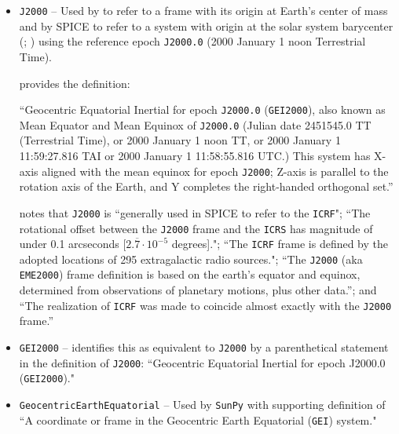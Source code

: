 \documentclass[draft]{agujournal2019}
\begin{document}
\begin{itemize}
    \parskip 0.1in 

    \item \texttt{J2000} -- Used by  to refer to a frame with its origin at Earth's center of mass and by SPICE to refer to a system with origin at the solar system barycenter (; ) using the reference epoch \texttt{J2000.0} (2000 January 1 noon Terrestrial Time).
    
      provides the definition:
     
     ``Geocentric Equatorial Inertial for epoch \texttt{J2000.0} (\texttt{GEI2000}), also known as Mean Equator and Mean Equinox of \texttt{J2000.0} (Julian date 2451545.0 TT (Terrestrial Time), or 2000 January 1 noon TT, or 2000 January 1 11:59:27.816 TAI or 2000 January 1 11:58:55.816 UTC.) This system has X-axis aligned with the mean equinox for epoch \texttt{J2000}; Z-axis is parallel to the rotation axis of the Earth, and Y completes the right-handed orthogonal set.''


     notes that \texttt{J2000} is ``generally used in SPICE to refer to the \texttt{ICRF}"; ``The rotational offset between the \texttt{J2000} frame and the \texttt{ICRS} has magnitude of under 0.1 arcseconds [$2.\overline{7}\cdot 10^{-5}$ degrees]."; ``The \texttt{ICRF} frame is defined by the adopted locations of 295 extragalactic radio sources."; ``The \texttt{J2000} (aka \texttt{EME2000}) frame definition is based on the earth’s equator and equinox, determined from observations of planetary motions, plus other data.''; and ``The realization of \texttt{ICRF} was made to coincide almost exactly with the \texttt{J2000} frame.'' 



    \item \texttt{GEI2000} --  identifies this as equivalent to \texttt{J2000} by a parenthetical statement in the definition of \texttt{J2000}: ``Geocentric Equatorial Inertial for epoch J2000.0 (\texttt{GEI2000})."

    \item \texttt{GeocentricEarthEquatorial} -- Used by \texttt{SunPy} \cite{SunPy} with supporting definition of ``A coordinate or frame in the Geocentric Earth Equatorial (\texttt{GEI}) system."
    

\end{itemize}
\end{document}

